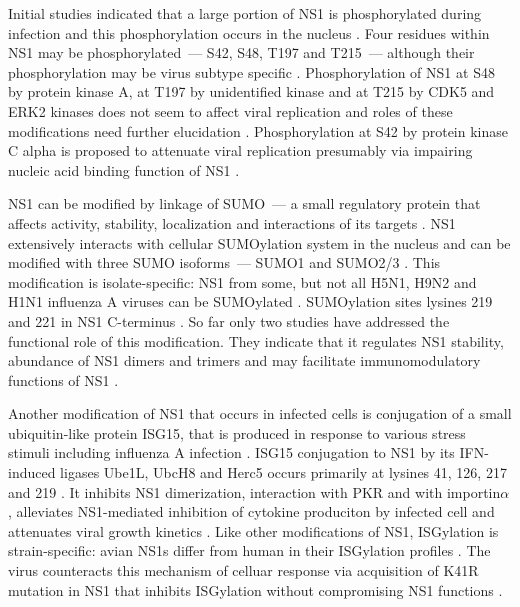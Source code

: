 		Initial studies indicated that a large portion of \gls{NS1} is phosphorylated during infection and this phosphorylation occurs in the nucleus \parencite{Privalsky1981}. Four residues within \gls{NS1} may be phosphorylated~--- S42, S48, T197 and T215~--- although their phosphorylation may be virus subtype specific \parencite{Petri1982}. Phosphorylation of \gls{NS1} at S48 by protein kinase A, at T197 by unidentified kinase and at T215 by \gls{CDK5} and \gls{ERK2} kinases does not seem to affect viral replication and roles of these modifications need further elucidation \parencite{Hale2009, Hutchinson2012, Hsiang2012}. Phosphorylation at S42 by protein kinase C alpha is proposed to attenuate viral replication presumably via impairing nucleic acid binding function of \gls{NS1} \parencite{Hsiang2012}.
		
		\gls{NS1} can be modified by linkage of \gls{SUMO}~--- a small regulatory protein that affects activity, stability, localization and interactions of its targets \parencite{Johnson2004, Pal2010a}. \gls{NS1} extensively interacts with cellular \gls{SUMO}ylation system in the nucleus and can be modified with three \gls{SUMO} isoforms~--- \gls{SUMO}1 and \gls{SUMO}2/3 \parencite{Pal2011, Santos2013a}. This modification is isolate-specific: \gls{NS1} from some, but not all H5N1, H9N2 and H1N1 influenza A viruses can be \gls{SUMO}ylated \parencite{Xu2011}. \gls{SUMO}ylation sites lysines 219 and 221 in NS1 C-terminus \parencite{Xu2011}. So far only two studies have addressed the functional role of this modification. They indicate that it regulates \gls{NS1} stability, abundance of \gls{NS1} dimers and trimers and may facilitate immunomodulatory functions of \gls{NS1} \parencite{Xu2011, Santos2013a}. 
		
		Another modification of \gls{NS1} that occurs in infected cells is conjugation of a small ubiquitin-like protein \gls{ISG15}, that is produced in response to various stress stimuli including influenza A infection \parencite{Pitha-Rowe2007, Sadler2008, Hsiang2009}. \gls{ISG15} conjugation to \gls{NS1} by its \gls{IFN}-induced ligases Ube1L, UbcH8 and Herc5 occurs primarily at lysines 41, 126, 217 and 219 \parencite{Zhao2010, Tang2010a}. It inhibits \gls{NS1} dimerization, interaction with \gls{PKR} and with importin$\alpha$, alleviates \gls{NS1}-mediated inhibition of cytokine produciton by infected cell and attenuates viral growth kinetics \parencite{Zhao2010, Tang2010a}. Like other modifications of \gls{NS1}, ISGylation is strain-specific: avian \gls{NS1}s differ from human in their ISGylation profiles \parencite{Tang2010a}. The virus counteracts this mechanism of celluar response via acquisition of K41R mutation in NS1 that inhibits ISGylation without compromising \gls{NS1} functions \parencite{Zhao2013}.
	
